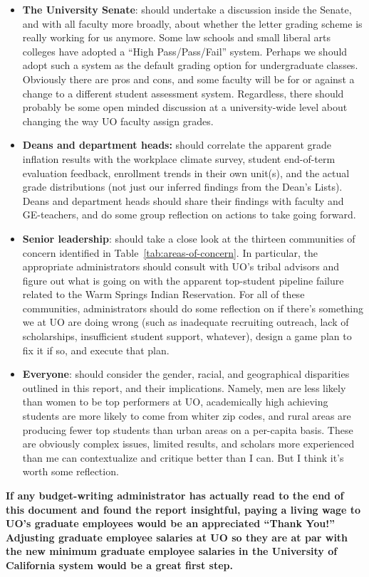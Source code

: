 \documentclass[10pt]{article}
\begin{document}
\begin{itemize}
	\item \textbf{The University Senate}: should undertake a discussion inside the Senate, and with all faculty more broadly, about whether the letter grading scheme is really working for us anymore. Some law schools and small liberal arts colleges have adopted a ``High Pass/Pass/Fail'' system. Perhaps we should adopt such a system as the default grading option for undergraduate classes. Obviously there are pros and cons, and some faculty will be for or against a change to a different student assessment system. Regardless, there should probably be some open minded discussion at a university-wide level about changing the way UO faculty assign grades.
	\item \textbf{Deans and department heads:} should correlate the apparent grade inflation results with the workplace climate survey, student end-of-term evaluation feedback, enrollment trends in their own unit(s), and the actual grade distributions (not just our inferred findings from the Dean's Lists). Deans and department heads should share their findings with faculty and GE-teachers, and do some group reflection on actions to take going forward.
	\item \textbf{Senior leadership}: should take a close look at the thirteen communities of concern identified in Table~\ref{tab:areas-of-concern}. In particular, the appropriate administrators should consult with UO's tribal advisors and figure out what is going on with the apparent top-student pipeline failure related to the Warm Springs Indian Reservation. For all of these communities, administrators should do some reflection on if there's something we at UO are doing wrong (such as inadequate recruiting outreach, lack of scholarships, insufficient student support, whatever), design a game plan to fix it if so, and execute that plan.
	\item \textbf{Everyone}: should consider the gender, racial, and geographical disparities outlined in this report, and their implications. Namely, men are less likely than women to be top performers at UO, academically high achieving students are more likely to come from whiter zip codes, and rural areas are producing fewer top students than urban areas on a per-capita basis. These are obviously complex issues, limited results, and scholars more experienced than me can contextualize and critique better than I can. But I think it's worth some reflection.
\end{itemize}

\textbf{If any budget-writing administrator has actually read to the end of this document and found the report insightful, paying a living wage to UO's graduate employees would be an appreciated ``Thank You!'' Adjusting graduate employee salaries at UO so they are at par with the new minimum graduate employee salaries in the University of California system would be a great first step.}
\end{document}

